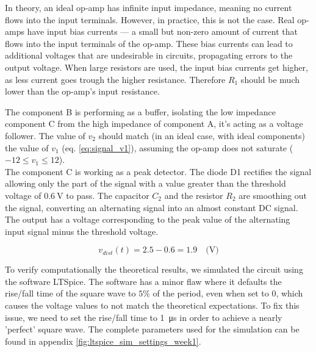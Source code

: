 \documentclass[lettersize,journal]{IEEEtran}
\begin{document}
In theory, an ideal op-amp has infinite input impedance, meaning no current flows into the input terminals. However, in practice, this is not the case. Real op-amps have input bias currents — a small but non-zero amount of current that flows into the input terminals of the op-amp. These bias currents can lead to additional voltages that are undesirable in circuits, propagating errors to the output voltage. When large resistors are used, the input bias currents get higher, as less current goes trough the higher resistance. Therefore $R_1$ should be much lower than the op-amp’s input resistance.

The component B is performing as a buffer, isolating the low impedance component C from the high impedance of component A, it's acting as a voltage follower. The value of $v_2$ should match (in an ideal case, with ideal components) the value of $v_1$ (eq. \ref{eq:signal_v1}), assuming the op-amp does not saturate ($-12 \leq v_1 \leq 12$).\\ 

The component C is working as a peak detector. The diode D1 rectifies the signal allowing only the part of the signal with a value greater than the threshold voltage of $\SI{0.6}{\volt}$ to pass. The capacitor $C_2$ and the resistor $R_2$ are smoothing out the signal, converting an alternating signal into an almost constant DC signal. The output has a voltage corresponding to the peak value of the alternating input signal minus the threshold voltage.

\begin{equation}
    v_{dist} (t) = 2.5 - 0.6 = 1.9 \quad \text{(V)}
    \label{eq:vdist_signal}
\end{equation}

To verify computationally the theoretical results, we simulated the circuit using the software LTSpice. The software has a minor flaw where it defaults the rise/fall time of the square wave to $5\%$ of the period, even when set to 0, which causes the voltage values to not match the theoretical expectations. To fix this issue, we need to set the rise/fall time to \SI{1}{\us} in order to achieve a nearly 'perfect' square wave. The complete parameters used for the simulation can be found in appendix \ref{fig:ltspice_sim_settings_week1}.
\end{document}
